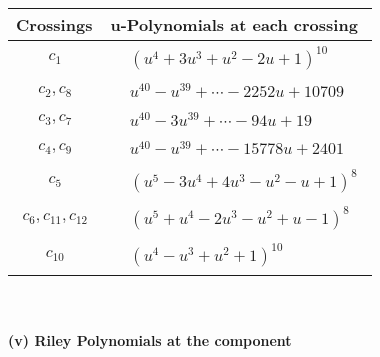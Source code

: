 \documentclass[1p]{elsarticle_modified}
\theoremstyle{definition}
\begin{document}
\begin{tabular}{m{50pt}|m{274pt}}
Crossings & \hspace{64pt}u-Polynomials at each crossing \\
\hline $$\begin{aligned}c_{1}\end{aligned}$$&$\begin{aligned}
&(u^4+3 u^3+u^2-2 u+1)^{10}
\end{aligned}$\\
\hline $$\begin{aligned}c_{2},c_{8}\end{aligned}$$&$\begin{aligned}
&u^{40}- u^{39}+\cdots-2252 u+10709
\end{aligned}$\\
\hline $$\begin{aligned}c_{3},c_{7}\end{aligned}$$&$\begin{aligned}
&u^{40}-3 u^{39}+\cdots-94 u+19
\end{aligned}$\\
\hline $$\begin{aligned}c_{4},c_{9}\end{aligned}$$&$\begin{aligned}
&u^{40}- u^{39}+\cdots-15778 u+2401
\end{aligned}$\\
\hline $$\begin{aligned}c_{5}\end{aligned}$$&$\begin{aligned}
&(u^5-3 u^4+4 u^3- u^2- u+1)^8
\end{aligned}$\\
\hline $$\begin{aligned}c_{6},c_{11},c_{12}\end{aligned}$$&$\begin{aligned}
&(u^5+u^4-2 u^3- u^2+u-1)^8
\end{aligned}$\\
\hline $$\begin{aligned}c_{10}\end{aligned}$$&$\begin{aligned}
&(u^4- u^3+u^2+1)^{10}
\end{aligned}$\\
\hline
\end{tabular}\\~\\
\newpage\renewcommand{\arraystretch}{1}
\flushleft \textbf{(v) Riley Polynomials at the component}\newline \\
\end{document}
